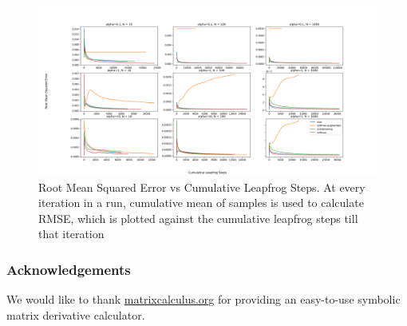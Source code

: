 \documentclass[11pt]{article}
\begin{document}
\begin{figure}[h!]
    \centering
    \includegraphics[width=1.2\textwidth]{figures/simplex/rmse.png}
    \caption{Root Mean Squared Error vs Cumulative Leapfrog Steps. At every iteration in a run, cumulative mean of samples is used to calculate RMSE, which is plotted against the cumulative leapfrog steps till that iteration}
    \label{fig:rmse}
\end{figure}
\clearpage
\subsubsection*{Acknowledgements}

We would like to thank \url{matrixcalculus.org} for providing an
easy-to-use symbolic matrix derivative calculator.



{}



\end{document}
